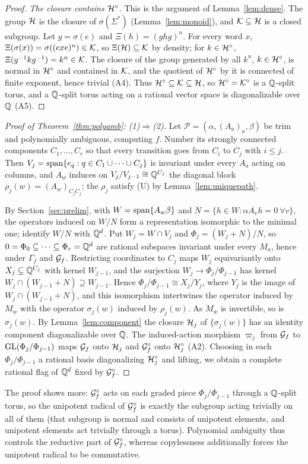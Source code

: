 \begin{proof}
\emph{The closure contains $\mathcal{H}^\circ$.} This is the argument of Lemma~\ref{lem:dense}. The group $\mathcal{H}$ is
the closure of $\sigma(\Sigma^*)$ (Lemma~\ref{lem:monoid}), and $\mathcal{K}\subseteq\mathcal{H}$ is a closed subgroup.
Let $g=\sigma(e)$ and $\Xi(h)=(ghg)^n$. For every word $x$, $\Xi(\sigma(x))=\sigma((exe)^n)\in\mathcal{K}$,
so $\Xi(\mathcal{H})\subseteq\mathcal{K}$ by density; for $k\in\mathcal{H}^\circ$, $\Xi(g^{-1}kg^{-1})=k^n\in\mathcal{K}$. The closure
of the group generated by all $k^n$, $k\in\mathcal{H}^\circ$, is normal in $\mathcal{H}^\circ$ and contained in $\mathcal{K}$,
and the quotient of $\mathcal{H}^\circ$ by it is connected of finite exponent, hence trivial (A4). Thus
$\mathcal{H}^\circ\subseteq\mathcal{K}\subseteq\mathcal{H}$, so $\mathcal{H}^\circ=\mathcal{K}^\circ$ is a $\mathbb{Q}$-split torus, and a $\mathbb{Q}$-split torus
acting on a rational vector space is diagonalizable over $\mathbb{Q}$ (A5).
\end{proof}

\begin{proof}[Proof of Theorem~\ref{thm:polyamb}: (1)$\Rightarrow$(2)]
Let $\mathcal P=(\alpha,(A_a)_a,\beta)$ be trim and polynomially ambiguous, computing $f$. Number its
strongly connected components $C_1,\ldots,C_r$ so that every transition goes from $C_i$ to $C_j$ with
$i\le j$. Then $V_j=\operatorname{span}\{e_q:q\in C_1\cup\cdots\cup C_j\}$ is invariant under every $A_a$ acting on
columns, and $A_w$ induces on $V_j/V_{j-1}\cong\mathbb{Q}^{C_j}$ the diagonal block
$\rho_j(w)=(A_w)_{C_jC_j}$; the $\rho_j$ satisfy (U) by Lemma~\ref{lem:uniquepath}.

By Section~\ref{sec:prelim}, with $W=\operatorname{span}\{A_w\beta\}$ and $N=\{h\in W:\alpha A_vh=0\ \forall v\}$, the
operators induced on $W/N$ form a representation isomorphic to the minimal one; identify $W/N$ with
$\mathbb{Q}^d$. Put $W_j=W\cap V_j$ and $\Phi_j=(W_j+N)/N$, so $0=\Phi_0\subseteq\cdots\subseteq \Phi_r=\mathbb{Q}^d$ are
rational subspaces invariant under every $M_a$, hence under $\Gamma_f$ and $\mathcal{G}_f$. Restricting
coordinates to $C_j$ maps $W_j$ equivariantly onto $X_j\subseteq\mathbb{Q}^{C_j}$ with kernel $W_{j-1}$, and
the surjection $W_j\to \Phi_j/\Phi_{j-1}$ has kernel $W_j\cap(W_{j-1}+N)\supseteq W_{j-1}$. Hence
$\Phi_j/\Phi_{j-1}\cong X_j/Y_j$, where $Y_j$ is the image of $W_j\cap(W_{j-1}+N)$, and this isomorphism
intertwines the operator induced by $M_w$ with the operator $\sigma_j(w)$ induced by $\rho_j(w)$. As
$M_w$ is invertible, so is $\sigma_j(w)$. By Lemma~\ref{lem:component} the closure $\mathcal{H}_j$ of
$\{\sigma_j(w)\}$ has an identity component diagonalizable over $\mathbb{Q}$. The induced-action morphism
$\varpi_j$ from $\mathcal{G}_f$ to $\mathrm{GL}(\Phi_j/\Phi_{j-1})$ maps $\mathcal{G}_f$ onto $\mathcal{H}_j$ and $\mathcal{G}_f^\circ$ onto $\mathcal{H}_j^\circ$
(A2). Choosing in each $\Phi_j/\Phi_{j-1}$ a rational basis diagonalizing $\mathcal{H}_j^\circ$ and lifting, we obtain
a complete rational flag of $\mathbb{Q}^d$ fixed by $\mathcal{G}_f^\circ$.
\end{proof}

The proof shows more: $\mathcal{G}_f^\circ$ acts on each graded piece $\Phi_j/\Phi_{j-1}$ through a $\mathbb{Q}$-split torus,
so the unipotent radical of $\mathcal{G}_f^\circ$ is exactly the subgroup acting trivially on all of them
(that subgroup is normal and consists of unipotent elements, and unipotent elements act trivially
through a torus).
Polynomial ambiguity thus controls the reductive part of $\mathcal{G}_f^\circ$, whereas copylessness
additionally forces the unipotent radical to be commutative.
